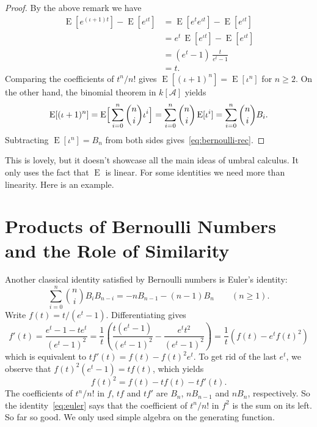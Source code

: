 \documentclass[11pt,a4paper]{report}
\theoremstyle{plain}
\theoremstyle{definition}
\theoremstyle{remark}
\newcommand{\E}{\operatorname{E}}
\begin{document}
\begin{proof}
By the above remark we have
\begin{align*}
  \E[e^{(\iota+1)t}] - \E[e^{\iota t}]
    &= \E[e^{t} e^{\iota t}] - \E[e^{\iota t}] \\
    &= e^{t}\,\E[e^{\iota t}] - \E[e^{\iota t}] \\
    &= (e^{t} - 1)\,\frac{t}{e^{t} - 1} \\
    &= t .
\end{align*}
Comparing the coefficients of $t^n/n!$ gives $\E[(\iota+1)^n] = \E[\iota^n]$ for
$n \geq 2$. On the other hand, the binomial theorem in $k[\mathcal{A}]$ yields
\[
  \E[(\iota+1)^n]
    = \E\Bigl[\,\sum_{i=0}^{n} \binom{n}{i} \iota^i\Bigr]
    = \sum_{i=0}^{n} \binom{n}{i} \E[\iota^i]
    = \sum_{i=0}^{n} \binom{n}{i} B_i .
\]
Subtracting $\E[\iota^n] = B_n$ from both sides gives~\eqref{eq:bernoulli-rec}.
\end{proof}

This is lovely, but it doesn't showcase all the main ideas of umbral calculus. It only uses the
fact that $\E$ is linear. For some identities we need more than linearity. Here is an example.

\section{Products of Bernoulli Numbers and the Role of Similarity}
\label{sec:euler}

Another classical identity satisfied by Bernoulli numbers is Euler's identity:
\begin{equation}
\label{eq:euler}
  \sum_{i=0}^{n} \binom{n}{i} B_i B_{n-i} = -n B_{n-1} - (n-1) B_n
  \qquad (n \geq 1) .
\end{equation}
Write $f(t) = t/(e^t - 1)$. Differentiating gives
\[
f'(t) = 
\frac{e^t -1 - te^t}{(e^t - 1)^2} = 
\frac{1}{t} \left( \frac{t(e^t - 1)}{(e^t - 1)^2} - \frac{e^tt^2}{(e^t - 1)^2} \right) = 
\frac{1}{t}(f(t) - e^tf(t)^2)
\]
which is equivalent to $t f'(t) = f(t) - f(t)^2 e^t$. To get rid of the last $e^t$, we observe that $f(t)^2(e^t - 1) = t f(t)$, which yields
\begin{equation}
\label{eq:fsquare}
  f(t)^2 = f(t) - t f(t) - t f'(t) .
\end{equation}
The coefficients of $t^n/n!$ in $f$, $tf$ and $tf'$ are $B_n$, $n B_{n-1}$
and $n B_n$, respectively. So the identity~\eqref{eq:euler} says that the coefficient of
$t^n/n!$ in $f^2$ is the sum on its left. So far so good. We only used simple algebra on the generating function. 
\end{document}
